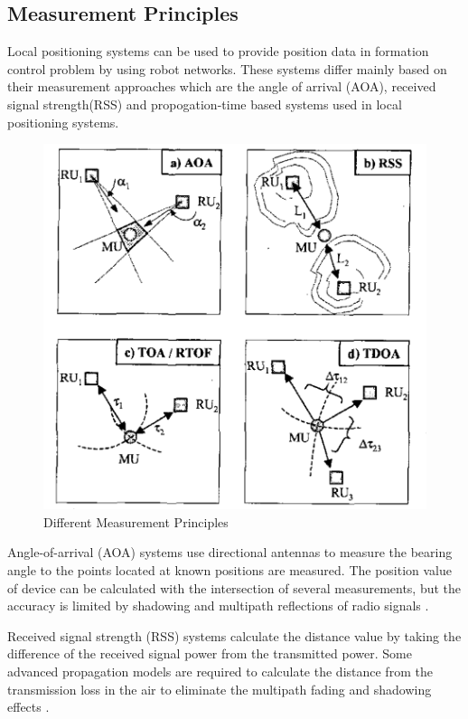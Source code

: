\subsection{Measurement Principles} \label{sssec:num1}
Local positioning systems can be used to provide position data in formation control problem by using robot networks. These systems differ mainly based on their measurement approaches which are the angle of arrival (AOA), received signal strength(RSS) and propogation-time based systems used in local positioning systems. 

\begin{figure}[H]
	\caption{Different Measurement Principles \cite{20}}
	\centering
	\includegraphics[scale = 0.4]{measurement}
\end{figure} 

Angle-of-arrival (AOA) systems use directional antennas to measure the bearing angle to the points located at known positions are measured. The position value of device can be calculated with the intersection of several measurements, but the accuracy is limited by shadowing and multipath reflections of radio signals \cite{20}. 

Received signal strength (RSS) systems calculate the distance value by taking the difference of the received signal power from the transmitted power. Some advanced propagation models are required to calculate the distance from the transmission loss in the air to eliminate the multipath fading and shadowing effects \cite{21}. 

